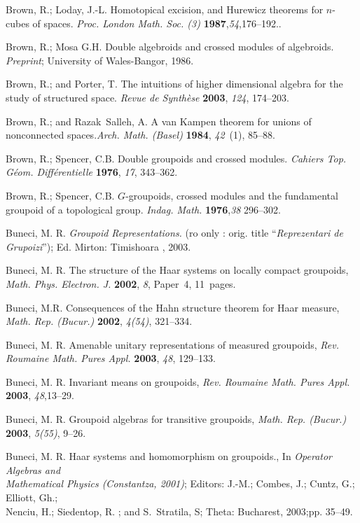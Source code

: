 \documentclass[12pt]{article}
\theoremstyle{plain}
\theoremstyle{definition}
\numberwithin{equation}{section}
\begin{document}
\begin{thebibliography}{199}
Brown, R.; Loday, J.-L. Homotopical excision, and Hurewicz theorems for $n$-cubes of spaces. \emph{Proc. London Math. Soc. (3)} {\bf 1987},{\em 54},176--192..

Brown, R.; Mosa G.H.  Double algebroids and crossed modules of algebroids. {\em Preprint}; University of Wales-Bangor, 1986.

Brown, R.; and Porter, T.  The intuitions of higher dimensional algebra for the study   of structured space.  \emph{Revue de Synth\`ese}  {\bf 2003}, {\em 124}, 174--203.

Brown, R.; and Razak~Salleh, A. A van Kampen theorem for unions of nonconnected spaces.{\em Arch. Math. (Basel)} {\bf 1984}, {\em 42}~(1), 85--88.

Brown, R.;  Spencer, C.B.  Double groupoids and crossed modules. \emph{Cahiers Top. G\'eom. Diff\'erentielle}  {\bf 1976}, {\em 17},
343--362.

Brown, R.;  Spencer, C.B. $G$-groupoids, crossed modules and the fundamental groupoid of a topological group. {\em Indag. Math.} {\bf
1976},{\em 38}  296--302.

 Buneci, M. R. \emph{Groupoid Representations.} (ro only : orig. title ``{\em Reprezentari de Grupoizi}'');  Ed. Mirton: Timishoara , 2003.

Buneci, M. R.  The structure of the Haar systems on locally compact groupoids, \textit{Math. Phys. Electron. J.}  {\bf 2002}, {\em 8}, Paper~4, 11~pages.

Buneci, M.R. Consequences of the Hahn structure theorem for Haar measure, \textit{Math. Rep. (Bucur.)}  {\bf 2002}, {\em 4(54)}, 321--334.

Buneci, M. R.  Amenable unitary representations of measured groupoids, \textit{Rev. Roumaine Math. Pures Appl.}  {\bf 2003}, {\em 48}, 129--133.

Buneci, M. R. Invariant means on groupoids, \textit{Rev. Roumaine Math. Pures Appl.}  {\bf 2003}, {\em 48},13--29.

Buneci, M. R. Groupoid algebras for transitive groupoids, \textit{Math. Rep. (Bucur.)}  {\bf 2003}, {\em 5(55)}, 9--26.

Buneci, M. R. Haar systems and homomorphism on groupoids., In  {\em Operator Algebras and \\
Mathematical Physics  (Constantza, 2001)}; Editors: J.-M.; Combes, J.; Cuntz, G.; Elliott, Gh.; \\
 Nenciu, H.; Siedentop, R. ; and  S.~Stratila, S; Theta: Bucharest, 2003;pp. 35--49.


\end{thebibliography}
\end{document}
